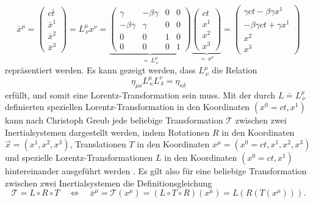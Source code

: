 \documentclass[a4paper,12pt]{article}
\numberwithin{equation}{section}
\begin{document}
\begin{equation}
\bar{x}^\mu = \begin{pmatrix}
c\bar{t} \\ \bar{x}^1 \\ \bar{x}^2 \\ \bar{x}^3
\end{pmatrix} = L^\mu_{\ \nu} x^\nu = \underbrace{\begin{pmatrix}
\gamma & -\beta\gamma & 0 & 0 \\
-\beta\gamma & \gamma & 0 & 0 \\
0 & 0 & 1 & 0 \\
0 & 0 & 0 & 1
\end{pmatrix}}_{= \, L^\mu_{\ \nu}}\underbrace{\begin{pmatrix}
ct \\ x^1 \\ x^2 \\ x^3
\end{pmatrix}}_{= \, x^\nu} = \begin{pmatrix}
\gamma ct - \beta\gamma x^1 \\ -\beta\gamma ct + \gamma x^1 \\ x^2 \\ x^3
\end{pmatrix}
\end{equation} repräsentiert werden. Es kann gezeigt werden, dass $L^\mu_{\ \nu}$ die Relation \begin{equation}
\eta_{\mu\nu} L^\mu_{\ \kappa}L^\nu_{\ \delta} = \eta_{\kappa \delta}
\end{equation} erfüllt, und somit eine Lorentz-Transformation sein muss. Mit der durch $L \doteq L^\mu_{\ \nu}$ definierten speziellen Lorentz-Transformation in den Koordinaten $(x^0=ct, x^1)$ kann nach Christoph Greub jede beliebige Transformation $\mathcal{T}$ zwischen zwei Inertialsystemen dargestellt werden, indem Rotationen $R$ in den Koordinaten $\vec{x} = (x^1,x^2,x^3)$, Translationen $T$ in den Koordinaten $x^\mu = (x^0=ct,x^1,x^2,x^3)$ und spezielle Lorentz-Transformationen $L$ in den Koordinaten $(x^0 = ct, x^1)$ hintereinander ausgeführt werden \cite[S.137-139]{Greub.2019}. Es gilt also für eine beliebige Transformation zwischen zwei Inertialsystemen die Definitionsgleichung \begin{equation}
\mathcal{T} = L \circ R \circ T \quad \Leftrightarrow \quad \bar{x}^\mu = \mathcal{T}(x^\mu) = (L\circ T \circ R)(x^\mu) = L(R(T(x^\mu))).
\end{equation}
\end{document}
